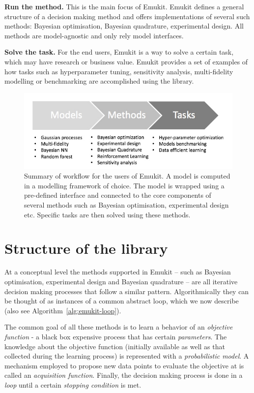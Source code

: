 \textbf{Run the method.} This is the main focus of Emukit. Emukit defines a general structure of a decision making method and offers implementations of several such methods: Bayesian optimisation, Bayesian quadrature, experimental design. All methods are model-agnostic and only rely model interfaces.

\textbf{Solve the task.} For the end users, Emukit is a way to solve a certain task, which may have research or business value. Emukit provides a set of examples of how tasks such as hyperparameter tuning, sensitivity analysis, multi-fidelity modelling or benchmarking are accomplished using the library.

\begin{figure}[h]
    \centering
    \includegraphics[scale=0.4]{workflow.png}  
    \caption{Summary of workflow for the users of Emukit. A model is computed in a modelling framework of choice. The model is wrapped using a pre-defined interface and connected to the core components of several methods such as Bayesian optimisation, experimental design etc. Specific tasks are then solved using these methods.}
    \label{figure:workflow}
\end{figure}

\section{Structure of the library}\label{sec:lib-structure}

At a conceptual level the methods supported in Emukit -- such as Bayesian optimisation, experimental design and Bayesian quadrature -- are all iterative decision making processes that follow a similar pattern. Algorithmically they can be thought of as instances of a common abstract loop, which we now describe (also see Algorithm~\ref{alg:emukit-loop}).

The common goal of all these methods is to learn a behavior of an \textit{objective function} - a black box expensive process that has certain \textit{parameters}. The knowledge about the objective function (initially available as well as that collected during the learning process) is represented with a \textit{probabilistic model}. A mechanism employed to propose new data points to evaluate the objective at is called an \textit{acquisition function}.  Finally, the decision making process is done in a \textit{loop} until a certain \textit{stopping condition} is met. 

